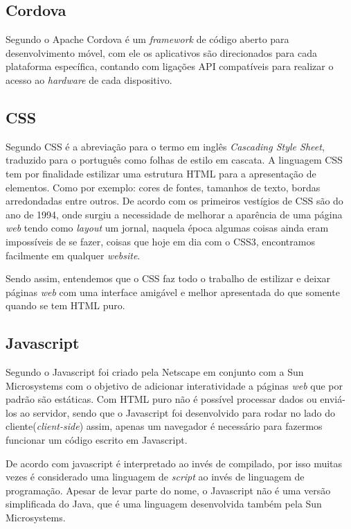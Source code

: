 	\subsection{Cordova}
		\par Segundo  o Apache Cordova é um \textit{framework} de código aberto para desenvolvimento móvel, com ele os aplicativos são direcionados para cada plataforma específica, contando com ligações API compatíveis para realizar o acesso ao \textit{hardware} de cada dispositivo.

	\subsection{CSS}
		\par Segundo  CSS é a abreviação para o termo em inglês \textit{Cascading Style Sheet}, traduzido para o
		português como folhas de estilo em cascata. A linguagem CSS tem por finalidade estilizar uma estrutura HTML para a apresentação de elementos. Como por exemplo: cores de fontes, tamanhos de texto, bordas arredondadas entre outros. De acordo com  os primeiros vestígios de CSS são do ano de 1994, onde surgiu a necessidade de melhorar a aparência de uma página \textit{web} tendo como \textit{layout} um jornal, naquela época algumas coisas ainda eram impossíveis de se fazer, coisas que hoje em dia com o CSS3, encontramos facilmente em qualquer \textit{website}.
		\par Sendo assim, entendemos que o CSS faz todo o trabalho de estilizar e deixar páginas \textit{web} com uma interface amigável e melhor apresentada do que somente quando se tem HTML puro.
		
	\subsection{Javascript}
		\par Segundo  o Javascript foi criado pela Netscape em conjunto com a Sun Microsystems com o objetivo de adicionar interatividade a páginas \textit{web} que por padrão são estáticas. Com HTML puro não é possível processar dados ou enviá-los ao servidor, sendo que o Javascript foi desenvolvido para rodar no lado do cliente(\textit{client-side}) assim, apenas um navegador é necessário para fazermos funcionar um código escrito em Javascript.
		\par De acordo com  javascript é interpretado ao invés de compilado, por isso muitas vezes é considerado uma linguagem de \textit{script} ao invés de linguagem de programação. Apesar de levar parte do nome, o Javascript não é uma versão simplificada do Java, que é uma linguagem desenvolvida também pela Sun Microsystems.
		
